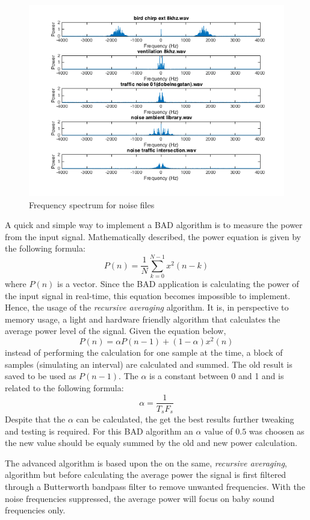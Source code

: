 \begin{figure}
  \centering
  \includegraphics[width=1\textwidth]{sections/freq_spec_noise_2.png}
  \caption{Frequency spectrum for noise files}
  \label{fig:noise_spec}
\end{figure}

A quick and simple way to implement a BAD algorithm is to measure the power from the input signal.
Mathematically described, the power equation is given by the following formula: 
\[
P(n) = \frac{1}{N} \sum\limits_{k=0}^{N-1} x^2(n-k)
\]
where $P(n)$ is a vector. Since the BAD application is calculating the power of the input signal in 
real-time, this equation becomes impossible to implement. Hence, the usage of the \emph{recursive
averaging} algorithm. It is, in perspective to memory usage, a light and hardware friendly algorithm 
that calculates the average power level of the signal. Given the equation below,
\[
P(n) = \alpha P(n-1)+(1-\alpha)x^2(n)
\]
instead of performing the calculation for one sample at the time, a block of samples (simulating an interval) are calculated and summed.
The old result is saved to be used as $P(n-1)$. The $\alpha$ is a constant between 0 and 1 and is related to the 
following formula:
\[
\alpha = \frac{1}{T_{s}F_{s}}
\]
Despite that the $\alpha$ can be calculated, the get the best results further tweaking and testing is required.
For this BAD algorithm an $\alpha$ value of $0.5$ was choosen as the new value should be equaly summed by the old and
new power calculation.

The advanced algorithm is based upon the on the same, \emph{recursive averaging}, algorithm but before calculating
the average power the signal is first filtered through a Butterworth bandpass filter to remove unwanted 
frequencies. With the noise frequencies suppressed, the average power will focus on baby sound frequencies only. 

